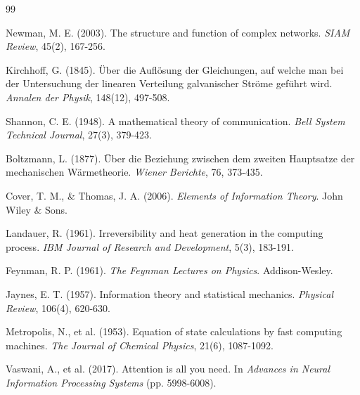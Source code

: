 \documentclass[12pt]{article}
\begin{document}

\begin{thebibliography}{99}

Newman, M. E. (2003). The structure and function of complex networks. \textit{SIAM Review}, 45(2), 167-256.

Kirchhoff, G. (1845). Über die Auflösung der Gleichungen, auf welche man bei der Untersuchung der linearen Verteilung galvanischer Ströme geführt wird. \textit{Annalen der Physik}, 148(12), 497-508.

Shannon, C. E. (1948). A mathematical theory of communication. \textit{Bell System Technical Journal}, 27(3), 379-423.

Boltzmann, L. (1877). Über die Beziehung zwischen dem zweiten Hauptsatze der mechanischen Wärmetheorie. \textit{Wiener Berichte}, 76, 373-435.

Cover, T. M., \& Thomas, J. A. (2006). \textit{Elements of Information Theory}. John Wiley \& Sons.

Landauer, R. (1961). Irreversibility and heat generation in the computing process. \textit{IBM Journal of Research and Development}, 5(3), 183-191.

Feynman, R. P. (1961). \textit{The Feynman Lectures on Physics}. Addison-Wesley.

Jaynes, E. T. (1957). Information theory and statistical mechanics. \textit{Physical Review}, 106(4), 620-630.

Metropolis, N., et al. (1953). Equation of state calculations by fast computing machines. \textit{The Journal of Chemical Physics}, 21(6), 1087-1092.

Vaswani, A., et al. (2017). Attention is all you need. In \textit{Advances in Neural Information Processing Systems} (pp. 5998-6008).

\end{thebibliography}
\end{document}

